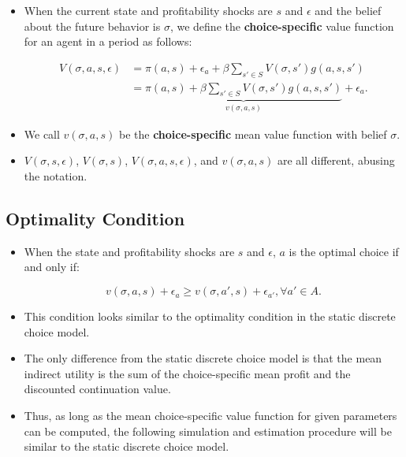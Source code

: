 \documentclass[]{book}
\providecommand{\tightlist}{%
  \setlength{\itemsep}{0pt}\setlength{\parskip}{0pt}}
\begin{document}
\begin{itemize}
\tightlist
\item
  When the current state and profitability shocks are \(s\) and
  \(\epsilon\) and the belief about the future behavior is \(\sigma\),
  we define the \textbf{choice-specific} value function for an agent in
  a period as follows:

  \begin{equation}
  \begin{split}
  V(\sigma, a, s, \epsilon) &= \pi(a , s) + \epsilon_a + \beta \sum_{s' \in S} V(\sigma, s') g(a, s, s')\\
   &= \underbrace{\pi(a , s) + \beta \sum_{s' \in S} V(\sigma, s') g(a, s, s')}_{v(\sigma, a, s)} + \epsilon_a.
  \end{split}
  \end{equation}
\item
  We call \(v(\sigma, a, s)\) be the \textbf{choice-specific} mean value
  function with belief \(\sigma\).
\item
  \(V(\sigma, s, \epsilon)\), \(V(\sigma, s)\),
  \(V(\sigma, a, s, \epsilon)\), and \(v(\sigma, a, s)\) are all
  different, abusing the notation.
\end{itemize}

\subsection{Optimality Condition}\label{optimality-condition}

\begin{itemize}
\tightlist
\item
  When the state and profitability shocks are \(s\) and \(\epsilon\),
  \(a\) is the optimal choice if and only if:

  \begin{equation}
  v(\sigma, a, s) + \epsilon_{a} \ge v(\sigma, a', s) + \epsilon_{a'}, \forall a' \in A.
  \end{equation}
\item
  This condition looks similar to the optimality condition in the static
  discrete choice model.
\item
  The only difference from the static discrete choice model is that the
  mean indirect utility is the sum of the choice-specific mean profit
  and the discounted continuation value.
\item
  Thus, as long as the mean choice-specific value function for given
  parameters can be computed, the following simulation and estimation
  procedure will be similar to the static discrete choice model.
\end{itemize}
\end{document}
